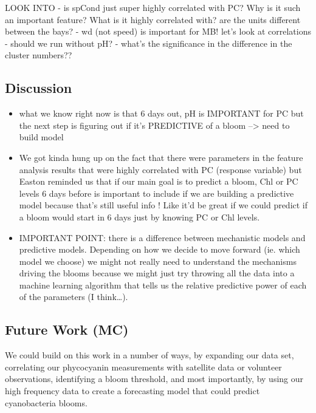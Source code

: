 \documentclass[]{article}
\providecommand{\tightlist}{%
  \setlength{\itemsep}{0pt}\setlength{\parskip}{0pt}}
\begin{document}
LOOK INTO - is spCond just super highly correlated with PC? Why is it
such an important feature? What is it highly correlated with? are the
units different between the bays? - wd (not speed) is important for MB!
let's look at correlations - should we run without pH? - what's the
significance in the difference in the cluster numbers??

\hypertarget{discussion}{%
\subsection{Discussion}\label{discussion}}

\begin{itemize}
\tightlist
\item
  what we know right now is that 6 days out, pH is IMPORTANT for PC but
  the next step is figuring out if it's PREDICTIVE of a bloom
  --\textgreater{} need to build model
\item
  We got kinda hung up on the fact that there were parameters in the
  feature analysis results that were highly correlated with PC (response
  variable) but Easton reminded us that if our main goal is to predict a
  bloom, Chl or PC levels 6 days before is important to include if we
  are building a predictive model because that's still useful info !
  Like it'd be great if we could predict if a bloom would start in 6
  days just by knowing PC or Chl levels.
\item
  IMPORTANT POINT: there is a difference between mechanistic models and
  predictive models. Depending on how we decide to move forward (ie.
  which model we choose) we might not really need to understand the
  mechanisms driving the blooms because we might just try throwing all
  the data into a machine learning algorithm that tells us the relative
  predictive power of each of the parameters (I think\ldots).
\end{itemize}

\hypertarget{future-work-mc}{%
\subsection{Future Work (MC)}\label{future-work-mc}}

We could build on this work in a number of ways, by expanding our data
set, correlating our phycocyanin measurements with satellite data or
volunteer observations, identifying a bloom threshold, and most
importantly, by using our high frequency data to create a forecasting
model that could predict cyanobacteria blooms.
\end{document}
